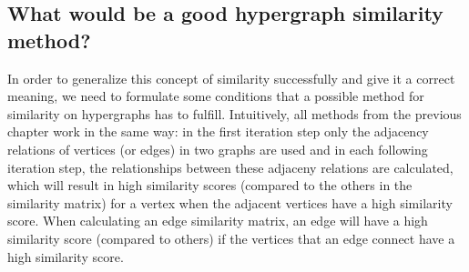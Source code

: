 \documentclass[a4paper,11pt]{report}
\begin{document}
\subsection{What would be a good hypergraph similarity method?}
In order to generalize
this concept of similarity successfully and give it a correct meaning, we need to formulate 
some conditions that a possible method for similarity on hypergraphs has to fulfill. 
Intuitively, all methods from the previous chapter work in the same way: in the 
first iteration step only the adjacency relations of vertices (or edges) in two graphs are 
used and in each following iteration step, the relationships between these 
adjaceny relations are calculated, which will result in high similarity scores (compared to the others in the similarity matrix)
for a vertex when the adjacent vertices have a high similarity score. When calculating an edge similarity matrix,
an edge will have a high similarity score (compared to others) if the vertices that an edge connect have a high similarity score.
 
\end{document}
